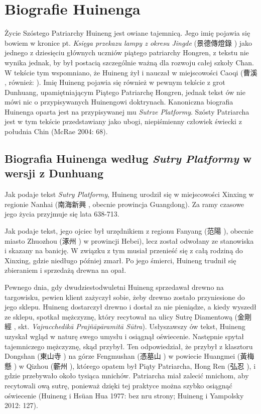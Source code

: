 \chapter{Biografie Huinenga}
Życie Szóstego Patriarchy Huineng jest owiane tajemnicą. Jego imię pojawia się bowiem w kronice pt. \textit{Księga przekazu lampy z okresu Jingde} (景德傳燈錄 ) jako jednego z dziesięciu głównych uczniów piątego patriarchy Hongren, z tekstu nie wynika jednak, by był postacią szczególnie ważną dla rozwoju całej szkoły Chan. W tekście tym wspomniano, że Huineng żył i nauczał w miejscowości Caoqi (曹溪 , również: ). Imię Huineng pojawia się również w pewnym tekście z grot Dunhuang, upamiętniającym Piątego Patriarchę Hongren, jednak tekst ów nie mówi nic o przypisywanych Huinengowi doktrynach. Kanoniczna biografia Huinenga oparta jest na przypisywanej mu \textit{Sutrze Platformy}. Szósty Patriarcha jest w tym tekście przedstawiany jako ubogi, niepiśmienny człowiek świecki z południa Chin (McRae 2004: 68).

\section{Biografia Huinenga według \textit{Sutry Platformy} w wersji z Dunhuang}
Jak podaje tekst \textit{Sutry Platformy}, Huineng urodził się w miejscowości Xinxing w regionie Nanhai (南海新興 , obecnie prowincja Guangdong). Za ramy czasowe jego życia przyjmuje się lata 638-713.

Jak podaje tekst, jego ojciec był urzędnikiem z regionu Fanyang (范陽 ), obecnie miasto Zhuozhou (涿州 ) w prowincji Hebei), lecz został odwołany ze stanowiska i skazany na banicję. W związku z tym musiał przenieść się z całą rodziną do Xinxing, gdzie niedługo później zmarł. Po jego śmierci, Huineng trudnił się zbieraniem i sprzedażą drewna na opał.

Pewnego dnia, gdy dwudziestodwuletni Huineng sprzedawał drewno na targowisku, pewien klient zażyczył sobie, żeby drewno zostało przyniesione do jego sklepu. Huineng dostarczył drewno i dostał za nie pieniądze, a kiedy wyszedł ze sklepu, spotkał mężczyznę, który recytował na ulicy Sutrę Diamentową (金剛經 , skt. \textit{Vajracchedikā Prajñāpāramitā Sūtra}). Usłyszawszy ów tekst, Huineng uzyskał wgląd w naturę swego umysłu i osiągnął oświecenie. Następnie spytał tajemniczego mężczyznę, skąd przybył. Ten odpowiedział, że przybył z klasztoru Dongshan (東山寺 ) na górze Fengmushan (憑墓山 ) w powiecie Huangmei (黃梅懸 ) w Qizhou (蘄州 ), którego opatem był Piąty Patriarcha, Hong Ren (弘忍 ), i gdzie przebywało około tysiąca mnichów. Patriarcha miał zalecić mnichom, aby recytowali ową sutrę, ponieważ dzięki tej praktyce można szybko osiągnąć oświecenie (Huineng i Hsüan Hua 1977: bez nru strony; Huineng i Yampolsky 2012: 127).

